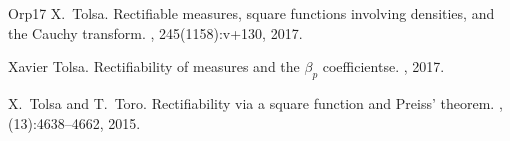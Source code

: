 \documentclass[11pt]{amsart}
\theoremstyle{definition}
\theoremstyle{remark}
\numberwithin{equation}{section}
\begin{document}
\begin{thebibliography}{{Orp}17}
X.~Tolsa.
\newblock Rectifiable measures, square functions involving densities, and the
  {C}auchy transform.
, 245(1158):v+130, 2017.

Xavier Tolsa.
\newblock Rectifiability of measures and the $\beta_p$ coefficientse.
, 2017.

X.~Tolsa and T.~Toro.
\newblock Rectifiability via a square function and {P}reiss' theorem.
, (13):4638--4662, 2015.

\end{thebibliography}
\end{document}

